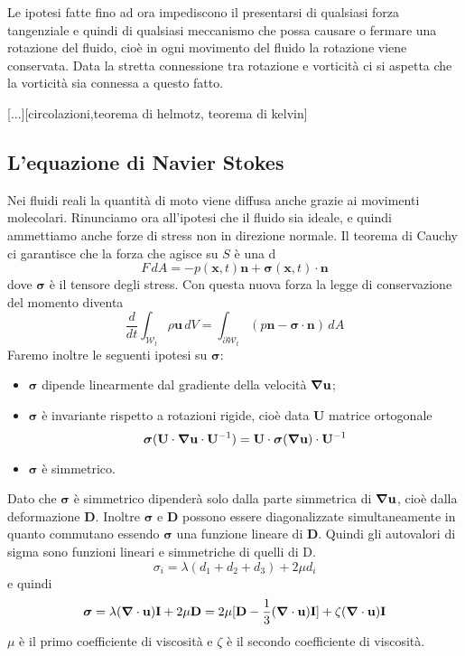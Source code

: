 Le ipotesi fatte fino ad ora impediscono il presentarsi di qualsiasi forza tangenziale e quindi di qualsiasi meccanismo che possa causare o fermare una rotazione del fluido, cioè in ogni movimento del fluido la rotazione viene conservata. Data la stretta connessione tra rotazione e vorticità ci si aspetta che la vorticità sia connessa a questo fatto. 

[...][circolazioni,teorema di helmotz, teorema di kelvin]

\subsection{L'equazione di Navier Stokes}
Nei fluidi reali la quantità di moto viene diffusa anche grazie ai movimenti molecolari.
Rinunciamo ora all'ipotesi che il fluido sia ideale, e quindi ammettiamo anche forze di stress non in direzione normale.
Il teorema di Cauchy ci garantisce che la forza che agisce su $S$ è una d
$$F \, dA = -p(\mathbf{x},t) \mathbf{n} + \boldsymbol{\sigma}(\mathbf{x},t) \cdot \mathbf{n}$$
dove $\boldsymbol{\sigma}$ è il tensore degli stress.
Con questa nuova forza la legge di conservazione del momento diventa
$$\frac{d}{dt} \int_{\mathcal{W}_t} \rho \mathbf{u} \, dV = \int_{\partial \mathcal{W}_t} (p \mathbf{n} - \boldsymbol{\sigma} \cdot \mathbf{n} )\, dA$$
Faremo inoltre le seguenti ipotesi su $\boldsymbol{\sigma}$: \begin{itemize}
  \item $\boldsymbol{\sigma}$ dipende linearmente dal gradiente della velocità $\boldsymbol{\nabla} \mathbf{u}$;
  \item $\boldsymbol{\sigma}$ è invariante rispetto a rotazioni rigide, cioè data $\mathbf{U}$ matrice ortogonale
$$\boldsymbol{\sigma}(\mathbf{U} \cdot \boldsymbol{\nabla} \mathbf{u} \cdot \mathbf{U}^{-1}) = \mathbf{U} \cdot \boldsymbol{\sigma}( \boldsymbol{\nabla} \mathbf{u} ) \cdot \mathbf{U}^{-1}$$
\item $\boldsymbol{\sigma}$ è simmetrico.
\end{itemize} 

Dato che $\boldsymbol{\sigma}$ è simmetrico dipenderà solo dalla parte simmetrica di $\boldsymbol{\nabla} \mathbf{u}$, cioè dalla deformazione $\mathbf{D}$. Inoltre $\boldsymbol{\sigma}$ e $\mathbf{D}$ possono essere diagonalizzate simultaneamente in quanto commutano essendo $\boldsymbol{\sigma}$ una funzione lineare di $\mathbf{D}$.
Quindi gli autovalori di sigma sono funzioni lineari e simmetriche di quelli di D.
$$\sigma_i = \lambda (d_1 + d_2 + d_3) +2 \mu d_i$$
e quindi 
$$\boldsymbol{\sigma} = \lambda ( \boldsymbol{\nabla}\cdot \mathbf{u}) \mathbf{I} + 2 \mu \mathbf{D}
                                     = 2 \mu [ \mathbf{D} - \frac{1}{3} ( \boldsymbol{\nabla}\cdot \mathbf{u}) \mathbf{I} ] + \zeta ( \boldsymbol{\nabla}\cdot \mathbf{u})  \mathbf{I}
$$
$\mu$ è il primo coefficiente di viscosità e $\zeta$ è il secondo coefficiente di viscosità.

